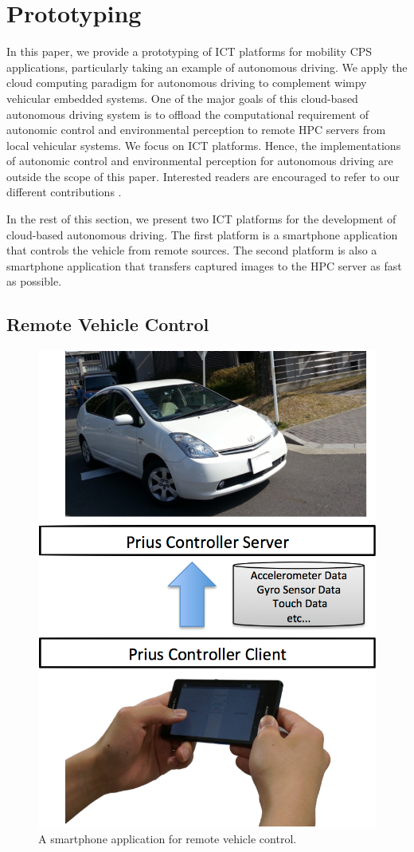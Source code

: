 \section{Prototyping}
\label{sec:prototype}

In this paper, we provide a prototyping of ICT platforms for mobility
CPS applications, particularly taking an example of autonomous driving.
We apply the cloud computing paradigm for autonomous driving to
complement wimpy vehicular embedded systems.
One of the major goals of this cloud-based autonomous driving system is
to offload the computational requirement of autonomic control and
environmental perception to remote HPC servers from local vehicular
systems.
We focus on ICT platforms.
Hence, the implementations of autonomic control and environmental
perception for autonomous driving are outside the scope of this paper.
Interested readers are encouraged to refer to our different
contributions \cite{Hirabayashi13, Kagami13}.

In the rest of this section, we present two ICT platforms for the
development of cloud-based autonomous driving.
The first platform is a smartphone application that controls the vehicle
from remote sources.
The second platform is also a smartphone application that transfers
captured images to the HPC server as fast as possible.

\subsection{Remote Vehicle Control}

\begin{figure}[!t]
 \centering
 \includegraphics[width=0.6\hsize]{fig/Andrive.pdf}
 \caption{A smartphone application for remote vehicle control.}
 \label{fig:andrive}
\end{figure}

